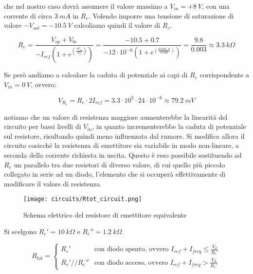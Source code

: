 che nel nostro caso dovrà assumere il valore massimo a $V_{in}=+8\ V$, con una corrente di
circa $3\ mA$  in $R_e$. Volendo imporre una tensione di saturazione di valore
$-V_{sat}=-10.5\ V$ calcoliamo quindi il valore di $R_e$.

\begin{equation}
    R_e=\frac{V_{op}+V_{be}}{-I_{ref}\left(1+e^{\left(\frac{sV_{in}}{V_T}\right)}\right)}=
    \frac{-10.5+0.7}{-12\cdot10^{-6}\left(1+e^{\left(\frac{0.018\cdot8}{0.026}\right)}\right)}=
    \frac{9.8}{0.003}\approx 3.3\ k\Omega
\end{equation}

Se però andiamo a calcolare la caduta di potenziale ai capi di $R_e$ corrispondente a $V_{in}=0\ V$,
ovvero:

\begin{equation}\label{vre}
    V_{R_e}=R_e\cdot 2I_{ref}=3.3\cdot10^3\cdot24\cdot10^{-6}\approx79.2\ mV
\end{equation}

notiamo che un valore di resistenza maggiore aumenterebbe la linearità del circuito per bassi
livelli di $V_{in}$, in quanto incrementerebbe la caduta di potenziale sul resistore,
risultando quindi meno influenzata dal rumore. Si modifica allora il circuito cosicché la
resistenza di emettitore sia variabile in modo non-lineare, a seconda della corrente richiesta
in uscita. Questo è reso possibile sostituendo ad $R_e$ un parallelo tra due resistori di
diverso valore, di cui quello più piccolo collegato in serie ad un diodo, l'elemento che si
occuperà effettivamente di modificare il valore di resistenza.

\begin{figure}[H]
    \centering
    \texttt{[image: circuits/Rtot\_circuit.png]}
    \caption{Schema elettrico del resistore di emettitore equivalente}
    \label{Rtot_circuit}
\end{figure}

Si scelgono $R_e'=10\ k\Omega$ e $R_e''=1.2\ k\Omega$.

\begin{equation}\label{rtot}
    R_{tot} =
    \left\{
    \begin{array}{lr}
        R_e'        & \text{con diodo spento, ovvero } I_{ref}+I_{freq}\leq\frac{V_d}{R_e'} \\
        R_e'//R_e'' & \text{con diodo acceso, ovvero } I_{ref}+I_{freq}>\frac{V_d}{R_e'}
    \end{array}
    \right.
\end{equation}

